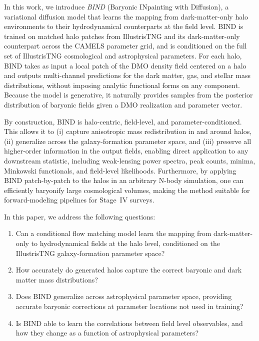\documentclass[linenumbers,trackchanges, twocolumn]{aastex701}
\begin{document}
In this work, we introduce \emph{BIND} (Baryonic INpainting with Diffusion), a variational diffusion model that learns the mapping from dark-matter-only halo environments to their hydrodynamical counterparts at the field level. BIND is trained on matched halo patches from IllustrisTNG and its dark-matter-only counterpart across the CAMELS parameter grid, and is conditioned on the full set of IllustrisTNG cosmological and astrophysical parameters. For each halo, BIND takes as input a local patch of the DMO density field centered on a halo and outputs multi-channel predictions for the dark matter, gas, and stellar mass distributions, without imposing analytic functional forms on any component. Because the model is generative, it naturally provides samples from the posterior distribution of baryonic fields given a DMO realization and parameter vector.

By construction, BIND is halo-centric, field-level, and parameter-conditioned. This allows it to (i) capture anisotropic mass redistribution in and around halos, (ii) generalize across the galaxy-formation parameter space, and (iii) preserve all higher-order information in the output fields, enabling direct application to any downstream statistic, including weak-lensing power spectra, peak counts, minima, Minkowski functionals, and field-level likelihoods. Furthermore, by applying BIND patch-by-patch to the halos in an arbitrary N-body simulation, one can efficiently baryonify large cosmological volumes, making the method suitable for forward-modeling pipelines for Stage~IV surveys. 

In this paper, we address the following questions:
\begin{enumerate}
    \item Can a conditional flow matching model learn the mapping from dark-matter-only to hydrodynamical fields at the halo level, conditioned on the IllustrisTNG galaxy-formation parameter space?
    \item How accurately do generated halos capture the correct baryonic and dark matter mass distributions?
    \item Does BIND generalize across astrophysical parameter space, providing accurate baryonic corrections at parameter locations not used in training?
    \item Is BIND able to learn the correlations between field level observables, and how they change as a function of astrophysical parameters?
\end{enumerate}
\end{document}

